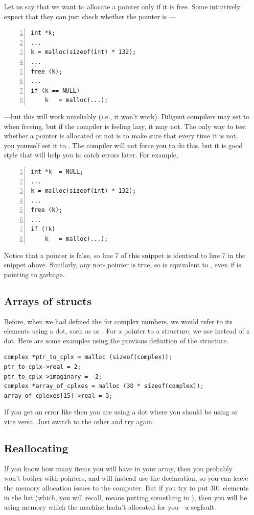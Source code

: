 Let us say that we want to allocate a pointer only if it is free. Some
intuitively expect that they can just check whether the pointer is
---
\begin{lstlisting}[numbers=left, numberstyle=\scshape]
int *k;
...
k = malloc(sizeof(int) * 132); 
...
free (k);
...
if (k == NULL)
    k   = malloc(...);
\end{lstlisting}
---but this will work unreliably (i.e., it won't work). Diligent compilers
may set  to  when freeing, but if the compiler is feeling
lazy, it may not. The only way
to test whether a pointer is allocated or not is to make sure that every
time it is not, you yourself set it to . The compiler will not
force you to do this, but it is good style that will help you to catch
errors later. For example,
\begin{lstlisting}[numbers=left, numberstyle=\scshape]
int *k  = NULL;
...
k = malloc(sizeof(int) * 132); 
...
free (k);
...
if (!k)
    k   = malloc(...);
\end{lstlisting}
Notice that a  pointer is false, so line 7 of this snippet is
identical to line 7 in the snippet above.
Similarly, any not- pointer is true,
so  is equivalent to , even if  is pointing
to garbage.


\subsection{Arrays of structs}	
Before, when we had defined the  for complex numbers, we would refer to its elements using a
dot, such as  or . For a pointer to a structure, we use \cind{$->$} instead of 
a dot.  Here are some examples using the previous definition of the  structure.
\begin{lstlisting}
complex *ptr_to_cplx = malloc (sizeof(complex));
ptr_to_cplx->real = 2;
ptr_to_cplx->imaginary = -2;
complex *array_of_cplxes = malloc (30 * sizeof(complex));
array_of_cplexes[15]->real = 3;
\end{lstlisting}

If you get an error like  then you are
using a dot where you should be using \cind{$->$} or vice versa. Just switch to the other and try again.


\subsection{Reallocating} If you know how many items you will have
in your array, then you probably won't bother with pointers, and will
instead use the  declaration, so you can leave
the memory allocation issues to the computer. But if you try to put 301
elements in the list (which, you will recall, means putting something
in ), then you will be using memory which the
machine hadn't
allocated for you---a segfault.

